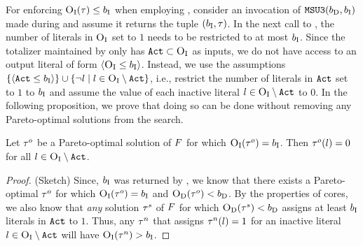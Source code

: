 For enforcing $\textsc{O}_{\text{I}}(\tau)\le b_{\text{I}}$ when employing \msu{}, consider an invocation of $\texttt{MSU3}(b_{\text{D}}, b_{\text{I}})$ made during \algname{} and assume it returns the tuple $(b_{\text{I}}, \tau)$. 
In the next call to \Simpr{}, the number of literals in $\textsc{O}_{\text{I}}$ set to $1$ needs to be restricted to at most $b_{\text{I}}$. 
Since the totalizer maintained by \msu{} only has $\texttt{Act} \subset \textsc{O}_{\text{I}}$ as inputs, we do not have access to an output literal of form  $\langle \textsc{O}_{\text{I}} \leq b_{\text{I}} \rangle$.
Instead, we use  the assumptions $\{ \langle \texttt{Act} \leq b_{\text{I}} \rangle\} \cup \{ \lnot l \mid l \in \textsc{O}_{\text{I}} \setminus \texttt{Act} \}$, i.e., restrict the number of literals in $\texttt{Act}$ set to $1$ to $b_{\text{I}}$ and assume the value of each inactive literal $l \in \textsc{O}_{\text{I}} \setminus \texttt{Act}$ to $0$. 
In the following proposition, we prove that doing so can be done without removing any Pareto-optimal solutions from the search. 
\begin{proposition}\label{prop:sound}
  Let $\tau^o$ be a Pareto-optimal solution of $F$ for which $\textsc{O}_{\text{I}}(\tau^o) = b_{\text{I}}$.
  Then $\tau^o(l) = 0$ for all $l \in \textsc{O}_{\text{I}} \setminus \texttt{Act}$. 
\end{proposition}
\begin{proof}(Sketch)
  Since, $b_{\text{I}}$ was returned by \msu{}, we know that there exists a Pareto-optimal $\tau^o$ for which $\textsc{O}_{\text{I}}(\tau^o) = b_{\text{I}}$ and $\textsc{O}_{\text{D}}(\tau^o) < b_{\text{D}}$.
  By the properties of cores, we also know that \emph{any} solution $\tau^s$ of $F$ for which $\textsc{O}_{\text{D}}(\tau^s) < b_{\text{D}}$ assigns at least $b_{\text{I}}$ literals in $\texttt{Act}$ to $1$.
  Thus, any $\tau^n$ that assigns $\tau^n(l) = 1$ for an inactive literal $l \in \textsc{O}_{\text{I}} \setminus \texttt{Act}$ will have $\textsc{O}_{\text{I}}(\tau^n) > b_{\text{I}}$.
\end{proof}

